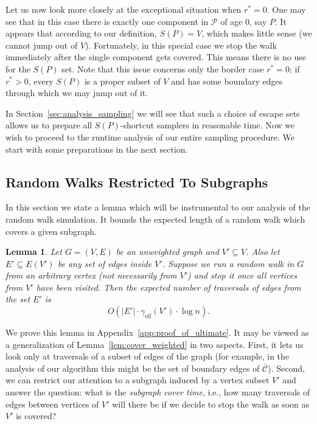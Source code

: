 \documentclass[11pt, letterpaper]{article}
\newtheorem{lemma}[theorem]{Lemma}
\newcommand{\ocC}{\bar{\mathcal{C}}}
\newcommand{\cP}{\mathcal{P}}
\newcommand{\diameff}{\gamma_{\mathrm{eff}}}
\begin{document}
Let us now look more closely at the exceptional situation when $r^*=0$. One may see that in this case there is exactly one component in $\cP$ of age $0$, say $P$. It appears that according to our definition, $S(P)=V$, which makes little sense (we cannot jump out of $V$). Fortunately, in this special case we stop the walk immediately after the single component gets covered. This means there is no use for the $S(P)$ set. Note that this issue concerns only the border case $r^*=0$; if $r^*>0$, every $S(P)$ is a proper subset of $V$ and has some boundary edges through which we may jump out of it.

In Section~\ref{sec:analysis_sampling} we will see that such a choice of escape sets allows us to prepare all $S(P)$-shortcut samplers in reasonable time. Now we wish to proceed to the runtime analysis of our entire sampling procedure. We start with some preparations in the next section.

\subsection{Random Walks Restricted To Subgraphs} \label{sec:random_walks_restricted_to_subgraphs}

In this section we state a lemma which will be instrumental to our analysis of the random walk simulation. It bounds the expected length of a random walk which covers a given subgraph.

\begin{lemma} \label{lem:ultimate}
Let $G = (V,E)$ be an unweighted graph and $V' \subseteq V$. Also let $E' \subseteq E(V')$ be any set of edges inside $V'$. Suppose we run a random walk in $G$ from an arbitrary vertex (not necessarily from $V'$) and stop it once all vertices from $V'$ have been visited. Then the expected number of traversals of edges from the set $E'$ is \[O(|E'| \cdot \diameff(V') \cdot \log n).\]
\end{lemma}

We prove this lemma in Appendix~\ref{app:proof_of_ultimate}. It may be viewed as a generalization of Lemma~\ref{lem:cover_weighted} in two aspects. First, it lets us look only at traversals of a subset of edges of the graph (for example, in the analysis of our algorithm this might be the set of boundary edges of $\ocC$). Second, we can restrict our attention to a subgraph induced by a vertex subset $V'$ and answer the question: what is the {\em subgraph cover time}, i.e., how many traversals of edges between vertices of $V'$ will there be if we decide to stop the walk as soon as $V'$ is covered? 
\end{document}
